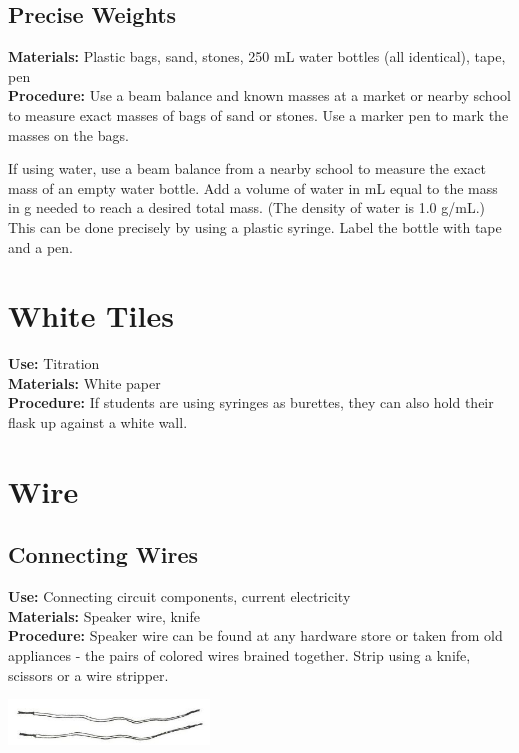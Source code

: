 \begin{multicols}{2}
\subsection{Precise Weights}
\vspace{-6pt}
\textbf{Materials:} Plastic bags, sand, stones, 250 mL water bottles (all identical), tape, pen\\
\textbf{Procedure:} 
Use a beam balance and known masses at a market or nearby school to measure exact masses of bags of sand or stones.  Use a marker pen to mark the masses on the bags. 

If using water, use a beam balance from a nearby school to measure the exact mass of an empty water bottle. Add a volume of water in mL equal to the mass in g needed to reach a desired total mass. (The density of water is 1.0 g/mL.) This can be done precisely by using a plastic syringe. Label the bottle with tape and a pen.

\columnbreak

\section{White Tiles} 
\label{sec:white-tiles}
\vspace{-10pt}
\textbf{Use:} Titration\\
\textbf{Materials:} White paper\\
\textbf{Procedure:} If students are using syringes as burettes, they can also hold their flask up against a white wall.

\section{Wire} 
\label{sec:wire}

\subsection{Connecting Wires} 
\vspace{-6pt}
\textbf{Use:} Connecting circuit components, current electricity\\
\textbf{Materials:} Speaker wire, knife\\
\textbf{Procedure:} Speaker wire can be found at any hardware store or taken from old appliances - the pairs of colored wires brained together. Strip using a knife, scissors or a wire stripper.
\begin{center}
\includegraphics[width=0.4\textwidth]{./img/source/wire.jpg}
\end{center}


\end{multicols}
